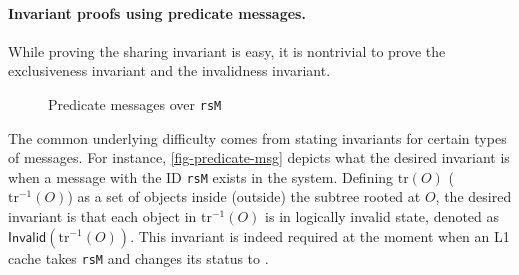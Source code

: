 \documentclass[sigplan,10pt,review,anonymous,screen]{acmart}\settopmatter{printfolios=true,printccs=false,printacmref=false}
\def\slstinline{\lstinline[basicstyle=\ttfamily\small]}
\begin{document}
\paragraph{Invariant proofs using predicate messages.}

\newcommand{\subtree}[1]{\ensuremath{\textrm{tr}(#1)}}
\newcommand{\subtreec}[1]{\ensuremath{\textrm{tr}^{-1}(#1)}}
\newcommand{\objsinv}[1]{\ensuremath{\textsf{Invalid}(#1)}}

While proving the sharing invariant is easy, it is nontrivial to prove the exclusiveness invariant and the invalidness invariant.

\begin{figure}[h]
  \centering
  \caption{Predicate messages over \slstinline{rsM}}
  \label{fig-predicate-msg}
\end{figure}

The common underlying difficulty comes from stating invariants for certain types of messages.
For instance, \autoref{fig-predicate-msg} depicts what the desired invariant is when a message with the ID \slstinline{rsM} exists in the system.
Defining $\subtree{O}$ ($\subtreec{O}$) as a set of objects inside (outside) the subtree rooted at $O$, the desired invariant is that each object in $\subtreec{O}$ is in logically invalid state, denoted as $\objsinv{\subtreec{O}}$.
This invariant is indeed required at the moment when an L1 cache takes \slstinline{rsM} and changes its status to \stM{}.
\end{document}
